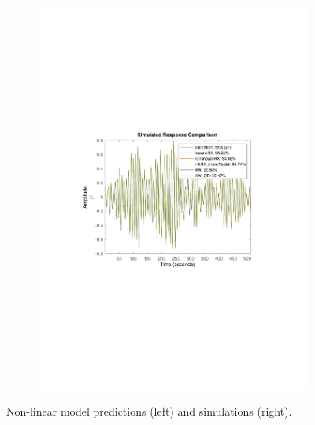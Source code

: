 \documentclass[]{article}
\begin{document}
\begin{figure}[ht]
\begin{subfigure}{.49\textwidth}
	\includegraphics[trim= 10cm 8cm 10cm 8cm, scale=0.4]{figures/simulations_nl.pdf}
\end{subfigure}
\caption{Non-linear model predictions (left) and simulations (right).}
\label{fig:correlations}
\end{figure}
\end{document}
